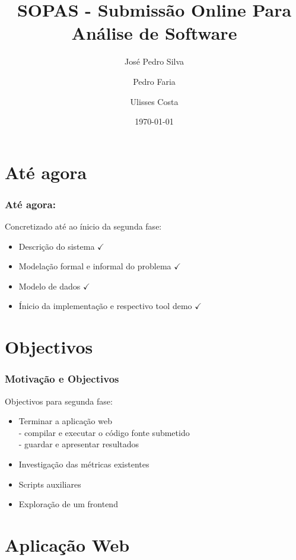 \documentclass{beamer}
\title{SOPAS - Submissão Online Para Análise de Software}
\author{José Pedro Silva \and
Pedro Faria \and
Ulisses Costa
}
\date{\today}
\institute{Engenharia de Linguagens\\
Projecto integrado
}
\begin{document}
\begin{frame}
   \titlepage
\end{frame}

\section{Até agora}
\begin{frame} \frametitle{Até agora:}
Concretizado até ao ínicio da segunda fase:
\begin{itemize}
\item Descrição do sistema {\color{green}$\checkmark$}
\item Modelação formal e informal do problema {\color{green}$\checkmark$}
\item Modelo de dados {\color{green}$\checkmark$}
\item Ínicio da implementação e respectivo tool demo {\color{green}$\checkmark$}
\end{itemize}
\end{frame}

\section{Objectivos}

\begin{frame} \frametitle{Motivação e Objectivos}
Objectivos para segunda fase:
\begin{itemize}
\item Terminar a aplicação web \\
- compilar e executar o código fonte submetido\\
- guardar e apresentar resultados\\
\item Investigação das métricas existentes
\item Scripts auxiliares
\item Exploração de um frontend
\end{itemize}
\end{frame}

\section{Aplicação Web}
\end{document}

